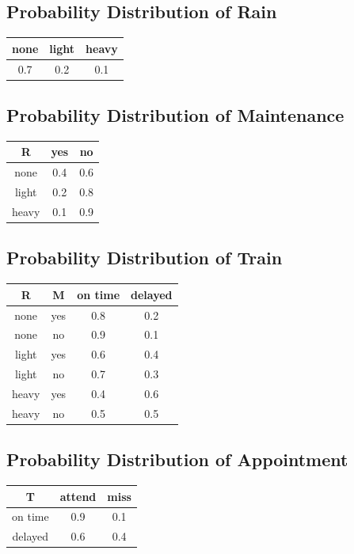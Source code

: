 \documentclass[16pt, A4Paper]{article}
\begin{document}
\subsection*{Probability Distribution of Rain}
\begin{center}
\begin{tabular}{ |c|c|c| } 
\hline
none & light & heavy \\
\hline
0.7 & 0.2 & 0.1 \\
\hline
\end{tabular}
\end{center}

\subsection*{Probability Distribution of Maintenance}
\begin{center}
\begin{tabular}{ |c|c|c| } 
\hline
R & yes & no \\
\hline
none & 0.4 & 0.6 \\
\hline
light & 0.2 & 0.8 \\
\hline
heavy & 0.1 & 0.9 \\
\hline
\end{tabular}
\end{center}

\subsection*{Probability Distribution of Train}
\begin{center}
\begin{tabular}{ |c|c|c|c| } 
\hline
R & M & on time & delayed \\ \hline
none & yes & 0.8 & 0.2 \\ \hline
none & no & 0.9 & 0.1 \\ \hline
light & yes & 0.6 & 0.4 \\ \hline
light & no & 0.7 & 0.3 \\ \hline
heavy & yes & 0.4 & 0.6 \\ \hline
heavy & no & 0.5 & 0.5 \\ \hline
\end{tabular}
\end{center}

\subsection*{Probability Distribution of Appointment}
\begin{center}
\begin{tabular}{ |c|c|c| } 
\hline
T & attend & miss \\ \hline
on time & 0.9 & 0.1 \\ \hline
delayed & 0.6 & 0.4 \\ \hline
\end{tabular}
\end{center}
\end{document}
